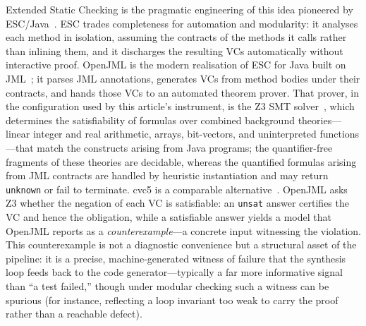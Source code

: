 Extended Static Checking is the pragmatic engineering of this idea pioneered by ESC/Java~\cite{flanagan2002escjava}. ESC trades completeness for automation and modularity: it analyses each method in isolation, assuming the contracts of the methods it calls rather than inlining them, and it discharges the resulting VCs automatically without interactive proof. OpenJML is the modern realisation of ESC for Java built on JML~\cite{cok2011openjml,cok2014openjml}; it parses JML annotations, generates VCs from method bodies under their contracts, and hands those VCs to an automated theorem prover. That prover, in the configuration used by this article's instrument, is the Z3 SMT solver~\cite{demoura2008z3}, which determines the satisfiability of formulas over combined background theories---linear integer and real arithmetic, arrays, bit-vectors, and uninterpreted functions---that match the constructs arising from Java programs; the quantifier-free fragments of these theories are decidable, whereas the quantified formulas arising from JML contracts are handled by heuristic instantiation and may return \texttt{unknown} or fail to terminate. cvc5 is a comparable alternative~\cite{barbosa2022cvc5}. OpenJML asks Z3 whether the negation of each VC is satisfiable: an \texttt{unsat} answer certifies the VC and hence the obligation, while a satisfiable answer yields a model that OpenJML reports as a \emph{counterexample}---a concrete input witnessing the violation. This counterexample is not a diagnostic convenience but a structural asset of the pipeline: it is a precise, machine-generated witness of failure that the synthesis loop feeds back to the code generator---typically a far more informative signal than ``a test failed,'' though under modular checking such a witness can be spurious (for instance, reflecting a loop invariant too weak to carry the proof rather than a reachable defect).


